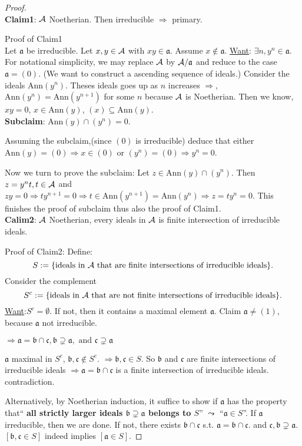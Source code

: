 \documentclass[11pt]{article}
\newcommand{\sca}{{\mathfrak a}}
\newcommand{\scb}{{\mathfrak b}}
\newcommand{\scc}{{\mathfrak c}}
\newcommand{\cala}{{\cal A}}
\newcommand{\Lrta}{\Longrightarrow}
\begin{document}
\begin{proof}\ \\
\textbf{Claim1}: $\cala$ Noetherian. Then irreducible $\Lrta$ primary.

Proof of Claim1\\
Let $\sca$ be irreducible. Let $x,y\in \cala$ with $xy \in \sca$. Assume $x\notin \sca$. \underline{Want}: $\exists n,y^n\in\sca$. For notational simplicity, we may replace $\cala$ by $\cala/\sca$ and reduce to the case $\sca=(0)$. (We want to construct a ascending sequence of ideals.) Consider the ideals $\text{Ann}(y^n)$. Theses ideals goes up  as $n$ increases $\Lrta$, $\text{Ann}(y^n)=\text{Ann}(y^{n+1})$ for some $n$ because $\cala$ is Noetherian. Then we know, $xy=0$, $x\in \text{Ann}(y)$, $(x)\subseteq \text{Ann}(y)$.\\
\textbf{Subclaim}: $\text{Ann}(y)\cap(y^n)=0$.

 Assuming the subclaim,(since $(0)$ is irreducible) deduce that either $\text{Ann}(y)=(0)\Lrta x\in (0)$ or $(y^n)=(0)\Lrta y^n=0$.

 Now we turn to prove the subclaim: Let $z\in \text{Ann}(y)\cap(y^n)$. Then $z=y^n t, t\in \cala $ and $zy=0\Lrta t y^{n+1}=0\Lrta t\in \text{Ann}(y^{n+1})=\text{Ann}(y^n)\Lrta z= t y^n=0$. This finishes the proof of subclaim thus also the proof of Claim1.\\
 \textbf{Calim2}: $\cala$ Noetherian, every ideals in $\cala$ is finite intersection of irreducible ideals.

 Proof of Claim2: Define:
$$
  S:=\{\text{ideals in $\cala$ that are finite intersections of irreducible ideals}\}.
$$ 
Consider the complement 
$$
S^c:=\{\text{ideals in $\cala$ that are not finite intersections of irreducible ideals}\}.
$$
 \underline{Want}:$S^c=\emptyset$. If not, then it contains a maximal element $\sca$. Claim $\sca\neq (1)$, because $\sca$ not irreducible. 

 $\Lrta\sca=\scb\cap \scc,\scb\supsetneq\sca, \text{ and }\scc\supsetneq \sca$

 $\sca$ maximal in $S^c$, $\scb, \scc\notin S^c$. $\Lrta \scb,\scc\in S$. So $\scb$ and $\scc$ are finite intersections of irreducible ideals $\Lrta\sca=\scb\cap\scc$ is a finite intersection of irreducible ideals. contradiction.

Alternatively, by Noetherian induction, it suffice to show if $\sca$ has the property that`` \textbf{all strictly larger ideals $\scb\supsetneq \sca$ belongs to $S$}''  $\leadsto$ ``$\sca\in S$''. If $\sca$ irreducible, then we are done. If not, there exists $\scb\cap\scc$ s.t. $\sca=\scb\cap\scc.$ and $ \scc,\scb\supsetneq \sca$. $[\scb,\scc\in S]$ indeed implies $[\sca\in S]$. 
\end{proof}
\end{document}
